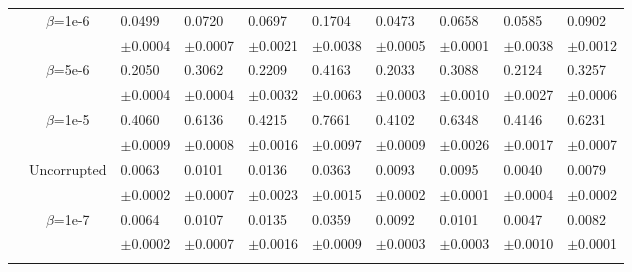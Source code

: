 \documentclass{article}
\begin{document}
\begin{table}[h!]
{\begin{tabularx}{\textwidth}{ccX X X X X X X X}
        & \multirow{2}{*}{$\beta$=1e-6}
        & 0.0499 & 0.0720 & 0.0697 & 0.1704 & 0.0473 & 0.0658 & 0.0585 & 0.0902\\
        &&\scriptsize$\pm$0.0004 & \scriptsize $\pm$0.0007 & \scriptsize $\pm$0.0021 & \scriptsize $\pm$0.0038 & \scriptsize $\pm$0.0005 & \scriptsize $\pm$0.0001 & \scriptsize $\pm$0.0038 & \scriptsize $\pm$0.0012\\
        \cline{3-10}\rule{0pt}{2.3ex}

        & \multirow{2}{*}{$\beta$=5e-6}
        & 0.2050 & 0.3062 & 0.2209 & 0.4163 & 0.2033 & 0.3088 & 0.2124 & 0.3257\\
        &&\scriptsize$\pm$0.0004 & \scriptsize $\pm$0.0004 & \scriptsize $\pm$0.0032 & \scriptsize $\pm$0.0063 & \scriptsize $\pm$0.0003 & \scriptsize $\pm$0.0010 & \scriptsize $\pm$0.0027 & \scriptsize $\pm$0.0006\\
        \cline{3-10}\rule{0pt}{2.3ex}

        & \multirow{2}{*}{$\beta$=1e-5}
        & 0.4060 & 0.6136 & 0.4215 & 0.7661 & 0.4102 & 0.6348 & 0.4146 & 0.6231\\
        &&\scriptsize$\pm$0.0009 & \scriptsize $\pm$0.0008 & \scriptsize $\pm$0.0016 & \scriptsize $\pm$0.0097 & \scriptsize $\pm$0.0009 & \scriptsize $\pm$0.0026 & \scriptsize $\pm$0.0017 & \scriptsize $\pm$0.0007\\

        \hline\rule{0pt}{2.3ex}

        \multirow{12}{*}{\textsf{MAE\textsubscript{ef}}}

        &\multirow{2}{*}{Uncorrupted}
        &{0.0063} & {0.0101} & {0.0136} & {0.0363} & {0.0093} & {0.0095} & {0.0040} & {0.0079}\\
        &&\scriptsize$\pm$0.0002 & \scriptsize $\pm$0.0007 & \scriptsize $\pm$0.0023 & \scriptsize $\pm$0.0015 & \scriptsize $\pm$0.0002 & \scriptsize $\pm$0.0001 & \scriptsize $\pm$0.0004 & \scriptsize $\pm$0.0002\\
        \cline{3-10}\rule{0pt}{2.3ex}

        & \multirow{2}{*}{$\beta$=1e-7}
        & 0.0064 & 0.0107 & 0.0135 & 0.0359 & 0.0092 & 0.0101 & 0.0047 & 0.0082\\
        &&\scriptsize$\pm$0.0002 & \scriptsize $\pm$0.0007 & \scriptsize $\pm$0.0016 & \scriptsize $\pm$0.0009 & \scriptsize $\pm$0.0003 & \scriptsize $\pm$0.0003 & \scriptsize $\pm$0.0010 & \scriptsize $\pm$0.0001\\
        \cline{3-10}\rule{0pt}{2.3ex}


\end{tabularx}}
\end{table}
\end{document}
